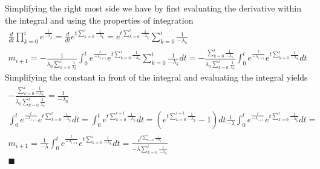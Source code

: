 \documentclass[12pt]{article}
\begin{document}
Simplifying the right most side we have by first evaluating the derivative within the integral and using the properties of integration
\begin{equation}
\begin{split}
\frac{d}{dt}\prod_{k=0}^ie^{\frac{t}{-\lambda_k}} = \frac{d}{dt}e^{t\sum_{k=0}^i\frac{1}{-\lambda_k}} = e^{t\sum_{k=0}^i\frac{1}{-\lambda_k}}\sum_{k=0}^i\frac{1}{-\lambda_k}\\
m_{i+1} = -\frac{1}{\lambda_0\sum_{k=0}^i\frac{1}{\lambda_k}}\int_0^t e^{\frac{t}{-\lambda_{i+1}}}e^{t\sum_{k=0}^i\frac{1}{-\lambda_k}}\sum_{k=0}^i\frac{1}{-\lambda_k}dt = -\frac{\sum_{k=0}^i\frac{1}{-\lambda_k}}{\lambda_0\sum_{k=0}^i\frac{1}{\lambda_k}}\int_0^t e^{\frac{t}{-\lambda_{i+1}}}e^{t\sum_{k=0}^i\frac{1}{-\lambda_k}}dt
\end{split}
\end{equation}
Simplifying the constant in front of the integral and evaluating the integral yields 
\begin{equation}
\begin{split}
-\frac{\sum_{k=0}^i\frac{1}{-\lambda_k}}{\lambda_0\sum_{k=0}^i\frac{1}{\lambda_k}} = \frac{1}{-\lambda_0}\\
\int_0^t e^{\frac{t}{-\lambda_{i+1}}}e^{t\sum_{k=0}^i\frac{1}{-\lambda_k}}dt = \int_0^t e^{t\sum_{k=0}^{i+1}\frac{1}{-\lambda_k}}dt = (e^{t\sum_{k=0}^{i+1}\frac{1}{-\lambda_k}}-1)dt  
\frac{1}{-\lambda}\int_0^t e^{\frac{t}{-\lambda_{i+1}}}e^{t\sum_{k=0}^i\frac{1}{-\lambda_k}}dt =  \\
m_{i+1} = \frac{1}{-\lambda}\int_0^t e^{\frac{t}{-\lambda_{i+1}}}e^{t\sum_{k=0}^i\frac{1}{-\lambda_k}}dt = \frac{e^{t\sum_{k=0}^i\frac{1}{-\lambda_k}}}{-\lambda\sum_{k=0}^i\frac{1}{-\lambda_k}}\\
\blacksquare
\end{split}
\end{equation}
\end{document}
